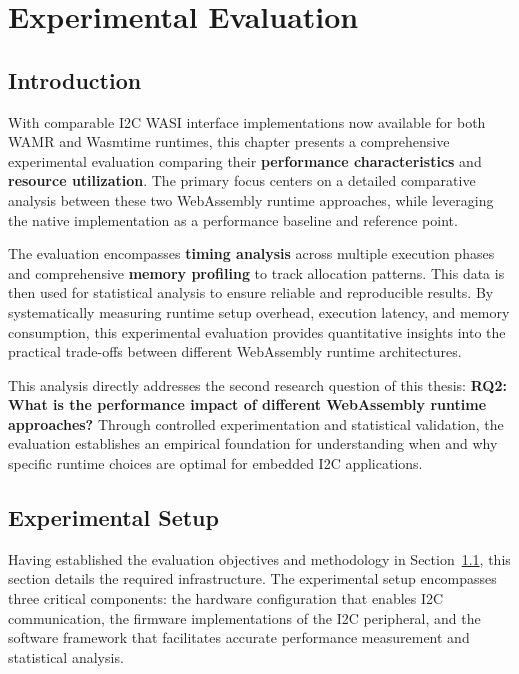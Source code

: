 \chapter{Experimental Evaluation}
\label{chap:5}

\section{Introduction}
\label{sec:eval-intro}

With comparable I2C WASI interface implementations now available for both WAMR and Wasmtime runtimes, this chapter presents a comprehensive experimental evaluation comparing their \textbf{performance characteristics} and \textbf{resource utilization}. The primary focus centers on a detailed comparative analysis between these two WebAssembly runtime approaches, while leveraging the native implementation as a performance baseline and reference point.

The evaluation encompasses \textbf{timing analysis} across multiple execution phases and comprehensive \textbf{memory profiling} to track allocation patterns. This data is then used for statistical analysis to ensure reliable and reproducible results. By systematically measuring runtime setup overhead, execution latency, and memory consumption, this experimental evaluation provides quantitative insights into the practical trade-offs between different WebAssembly runtime architectures.

This analysis directly addresses the second research question of this thesis: \textbf{RQ2: What is the performance impact of different WebAssembly runtime approaches?} Through controlled experimentation and statistical validation, the evaluation establishes an empirical foundation for understanding when and why specific runtime choices are optimal for embedded I2C applications.

\section{Experimental Setup}
\label{sec:experimental-setup}
Having established the evaluation objectives and methodology in Section~\ref{sec:eval-intro}, this section details the required infrastructure. The experimental setup encompasses three critical components: the hardware configuration that enables I2C communication, the firmware implementations of the I2C peripheral, and the software framework that facilitates accurate performance measurement and statistical analysis.

